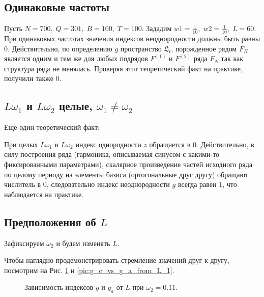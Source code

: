 \documentclass[specialist, substylefile = spbu.rtx,
			   subf, href, 12pt]{disser}
\begin{document}
\subsection{Одинаковые частоты}
Пусть $ N = 700,\; Q = 301,\; B = 100,\; T = 100 $. 
Зададим $w1 = \frac{1}{10},\; w2 = \frac{1}{10},\; L = 60$. При одинаковых частотах значения индексов неоднородности должны быть равны $ 0 $. Действительно, по определению $ g $ пространство $ \mathfrak{L_r} $, порожденное рядом $ F_N $ является одним и тем же для любых подрядов $ F^{(1)} $ и $ F^{(2)} $ ряда $ F_N $ так как структура ряда не менялась.
Проверяя этот теоретический факт на практике, получили также $ 0 $.

\subsection{$L\omega_1$ и $L\omega_2 $ целые, $\omega_1 \neq \omega_2 $}
Еще один теоретический факт: 

При целых $L\omega_1$ и $L\omega_2 $ индекс однородности $ z $ обращается в 0. Действительно, в силу построения ряда (гармоника, описываемая синусом с какими-то фиксированными параметрами), скалярное произведение частей исходного ряда по целому периоду на элементы базиса (ортогональные друг другу) обращают числитель в 0, следовательно индекс неоднородности $ g $ всегда равен $ 1 $, что наблюдается на практике.


\subsection{Предположения об $ L $}

Зафиксируем $ \omega_2 $ и будем изменять $ L $. 

Чтобы наглядно продемонстрировать стремление значений друг к другу, посмотрим на Рис. \ref{pic:g_c_vs_g_a_from_L} и \ref{pic:g_c_vs_g_a_from_L_1}.

\begin{figure}[!hhh]
	\caption{Зависимость индексов $ g $ и $ g_a $ от $ L $ при $ \omega_2 = 0.11 $.}
	\label{pic:g_c_vs_g_a_from_L}
\end{figure}
\end{document}
